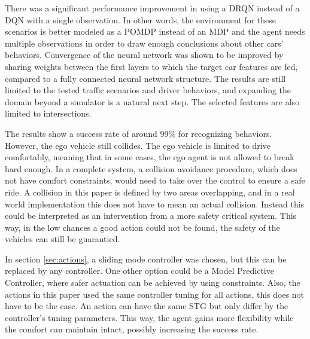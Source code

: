 There was a significant performance improvement in using a DRQN instead of a DQN with a single observation. In other words, the environment for these scenarios is better modeled as a POMDP instead of an MDP and the agent needs multiple observations in order to draw enough conclusions about other cars' behaviors.
Convergence of the neural network was shown to be improved by sharing weights between the first layers to which the target car features are fed, compared to a fully connected neural network structure.
The results are still limited to the tested traffic scenarios and driver behaviors, and expanding the domain beyond a simulator is a natural next step. The selected features are also limited to intersections. 

The results show a success rate of around 99\% for recognizing behaviors.  However, the ego vehicle still collides. The ego vehicle is limited to drive comfortably, meaning that in some cases, the ego agent is not allowed to break hard enough. In a complete system, a collision avoidance procedure, which does not have comfort constraints, would need to take over the control to ensure a safe ride.
A collision in this paper is defined by two areas overlapping, and in a real world implementation this does not have to mean an actual collision. Instead this could be interpreted as an intervention from a more safety critical system. This way, in the low chances a good action could not be found, the safety of the vehicles can still be guarantied. 

In section \ref{sec:actions}, a sliding mode controller was chosen, but this can be replaced by any controller. One other option could be a Model Predictive Controller, where safer actuation can be achieved by using constraints. Also, the actions in this paper used the same controller tuning for all actions, this does not have to be the case. An action can have the same STG but only differ by the controller's tuning parameters. This way, the agent gains more flexibility while the comfort can maintain intact, possibly increasing the success rate. 
